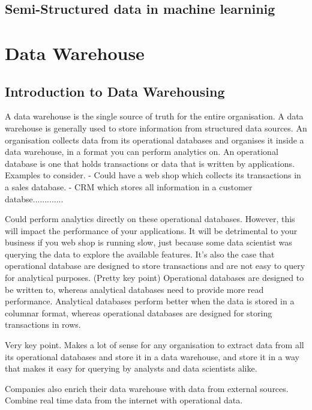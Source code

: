 \documentclass[11pt]{article}
\begin{document}
    \subsection{Semi-Structured data in machine learninig}

    \section{Data Warehouse}
    
    \subsection{Introduction to Data Warehousing}
    A data warehouse is the single source of truth for the entire organisation.
    A data warehouse is generally used to store information from structured data sources.
    An organisation collects data from its operational databases and organises it inside a data warehouse, in a format you can perform analytics on.
    An operational database is one that holds transactions or data that is written by applications.
    Examples to consider.
    - Could have a web shop which collects its transactions in a sales database.
    - CRM which stores all information in a customer databse.............

    Could perform analytics directly on these operational databases.
    However, this will impact the performance of your applications.
    It will be detrimental to your business if you web shop is running slow, just because some data scientist was querying the data to explore the available features.
    It's also the case that operational database are designed to store transactions and are not easy to query for analytical purposes. (Pretty key point)
    Operational databases are designed to be written to, whereas analytical databases need to provide more read performance.
    Analytical databases perform better when the data is stored in a columnar format, whereas operational databases are designed for storing transactions in rows.

    Very key point.
    Makes a lot of sense for any organisation to extract data from all its operational databases and store it in a data warehouse,
    and store it in a way that makes it easy for querying by analysts and data scientists alike.

    Companies also enrich their data warehouse with data from external sources.
    Combine real time data from the internet with operational data.
\end{document}
